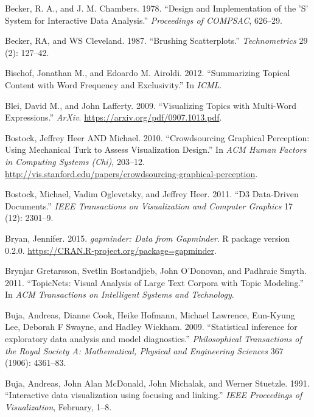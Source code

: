\documentclass[12pt,]{isuthesis}
\begin{document}
\hypertarget{ref-S:1978}{}
Becker, R. A., and J. M. Chambers. 1978. ``Design and Implementation of
the 'S' System for Interactive Data Analysis.'' \emph{Proceedings of
COMPSAC}, 626--29.

\hypertarget{ref-brushing-scatterplots}{}
Becker, RA, and WS Cleveland. 1987. ``Brushing Scatterplots.''
\emph{Technometrics} 29 (2): 127--42.

\hypertarget{ref-Bischof}{}
Bischof, Jonathan M., and Edoardo M. Airoldi. 2012. ``Summarizing
Topical Content with Word Frequency and Exclusivity.'' In \emph{ICML}.

\hypertarget{ref-Blei-2009}{}
Blei, David M., and John Lafferty. 2009. ``Visualizing Topics with
Multi-Word Expressions.'' \emph{ArXiv}.
\url{https://arxiv.org/pdf/0907.1013.pdf}.

\hypertarget{ref-crowdsourcing-graphical-perception}{}
Bostock, Jeffrey Heer AND Michael. 2010. ``Crowdsourcing Graphical
Perception: Using Mechanical Turk to Assess Visualization Design.'' In
\emph{ACM Human Factors in Computing Systems (Chi)}, 203--12.
\url{http://vis.stanford.edu/papers/crowdsourcing-graphical-perception}.

\hypertarget{ref-d3}{}
Bostock, Michael, Vadim Oglevetsky, and Jeffrey Heer. 2011. ``D3
Data-Driven Documents.'' \emph{IEEE Transactions on Visualization and
Computer Graphics} 17 (12): 2301--9.

\hypertarget{ref-gapminder}{}
Bryan, Jennifer. 2015. \emph{gapminder: Data from Gapminder}. R package
version 0.2.0. \url{https://CRAN.R-project.org/package=gapminder}.

\hypertarget{ref-Gretarsson}{}
Brynjar Gretarsson, Svetlin Bostandjieb, John O'Donovan, and Padhraic
Smyth. 2011. ``TopicNets: Visual Analysis of Large Text Corpora with
Topic Modeling.'' In \emph{ACM Transactions on Intelligent Systems and
Technology}.

\hypertarget{ref-Buja:2009hp}{}
Buja, Andreas, Dianne Cook, Heike Hofmann, Michael Lawrence, Eun-Kyung
Lee, Deborah F Swayne, and Hadley Wickham. 2009. ``Statistical inference
for exploratory data analysis and model diagnostics.''
\emph{Philosophical Transactions of the Royal Society A: Mathematical,
Physical and Engineering Sciences} 367 (1906): 4361--83.

\hypertarget{ref-Buja:1991vh}{}
Buja, Andreas, John Alan McDonald, John Michalak, and Werner Stuetzle.
1991. ``Interactive data visualization using focusing and linking.''
\emph{IEEE Proceedings of Visualization}, February, 1--8.
\end{document}
